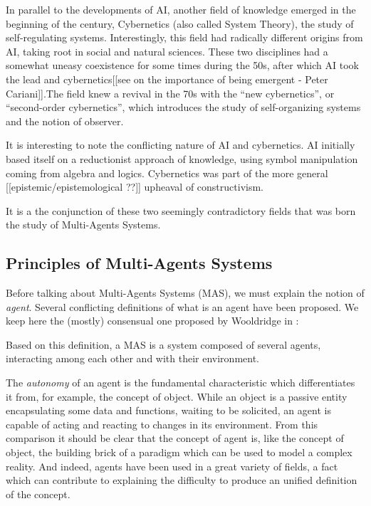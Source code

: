 In parallel to the developments of AI, another field of knowledge emerged in the beginning of the century, Cybernetics (also called System Theory), the study of self-regulating systems. Interestingly, this field had radically different origins from AI, taking root in social and natural sciences. These two disciplines had a somewhat uneasy coexistence for some times during the 50s, after which AI took the lead and cybernetics[[see on the importance of being emergent - Peter Cariani]].The field knew a revival in the 70s with the \enquote{new cybernetics}, or \enquote{second-order cybernetics}, which introduces the study of self-organizing systems and the notion of observer.

It is interesting to note the conflicting nature of AI and cybernetics. AI initially based itself on a reductionist approach of knowledge, using symbol manipulation coming from algebra and logics. Cybernetics was part of the more general [[epistemic/epistemological ??]] upheaval of constructivism.

It is a the conjunction of these two seemingly contradictory fields that was born the study of Multi-Agents Systems.

\subsection{Principles of Multi-Agents Systems}

Before talking about Multi-Agents Systems (MAS), we must explain the notion of \emph{agent}. Several conflicting definitions of what is an agent have been proposed. We keep here the (mostly) consensual one proposed by Wooldridge in \cite{wei1999mutiagent}:


Based on this definition, a MAS is a system composed of several agents, interacting among each other and with their environment.

The \emph{autonomy} of an agent is the fundamental characteristic which differentiates it from, for example, the concept of object. While an object is a passive entity encapsulating some data and functions, waiting to be solicited, an agent is capable of acting and reacting to changes in its environment. From this comparison it should be clear that the concept of agent is, like the concept of object, the building brick of a paradigm which can be used to model a complex reality. And indeed, agents have been used in a great variety of fields, a fact which can contribute to explaining the difficulty to produce an unified definition of the concept.

